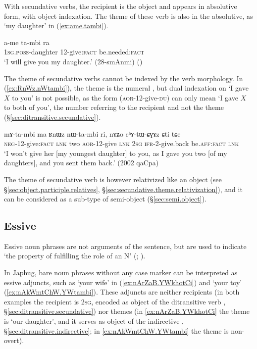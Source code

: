 With secundative verbs, the recipient is the object and appears in absolutive form, with object indexation. The theme of these verb is also in the absolutive, as  `my daughter' in (\ref{ex:ame.tambi}).

\begin{exe}
\ex \label{ex:ame.tambi}
 \gll a-me ta-mbi ra \\
\textsc{1sg}.\textsc{poss}-daughter 1\fl{}2-give:\textsc{fact} be.needed:\textsc{fact} \\
\glt  `I will give you my daughter.'  (28-smAnmi) ()
\end{exe}

The theme of secundative verbs cannot be indexed by the verb morphology. In (\ref{ex:RnWz.nWtambi}), the theme is the numeral , but dual indexation on  `I gave $X$ to you' is not possible, as the form  (\textsc{aor}-1\fl{}2-give-\textsc{du}) can only mean `I gave $X$ to both of you', the number referring to the recipient and not the theme (§\ref{sec:ditransitive.secundative}). 

\begin{exe}
\ex \label{ex:RnWz.nWtambi}
 \gll mɤ-ta-mbi ma ʁnɯz nɯ-ta-mbi ri, nɤʑo cʰɤ-tɯ-ɕɣɤz ɕti tɕe \\
 \textsc{neg}-1\fl{}2-give:\textsc{fact} \textsc{lnk} two  \textsc{aor}-1\fl{}2-give \textsc{lnk} \textsc{2sg} \textsc{ifr}-2-give.back be.\textsc{aff}:\textsc{fact} \textsc{lnk} \\
 \glt `I won't give her [my youngest daughter] to you, as I gave you two [of my daughters], and you sent them back.' (2002 qaCpa)
\end{exe}

The theme of secundative verb is however relativized like an object (see §\ref{sec:object.participle.relatives}, §\ref{sec:secundative.theme.relativization}), and it can be considered as a sub-type of semi-object (§\ref{sec:semi.object}).

\subsection{Essive} \label{sec:essive.abs} 
Essive noun phrases are not arguments of the sentence, but are used to indicate `the property of fulfilling the role of an N' (\citealt[606]{creissels14functive}; \citealt[225]{jacques16complementation}).

In Japhug, bare noun phrases without any case marker can be interpreted as essive adjuncts, such as  `your wife' in (\ref{ex:nArZaB.YWkhotCi}) and  `your toy' (\ref{ex:nAkWmtChW.YWtambi}). These adjuncts are neither recipients (in both examples the recipient is \textsc{2sg}, encoded as object of the ditransitive verb , §\ref{sec:ditransitive.secundative}) nor themes (in \ref{ex:nArZaB.YWkhotCi} the theme is  `our daughter', and it serves as object of the indirective , §\ref{sec:ditransitive.indirective}; in \ref{ex:nAkWmtChW.YWtambi} the theme is non-overt).

